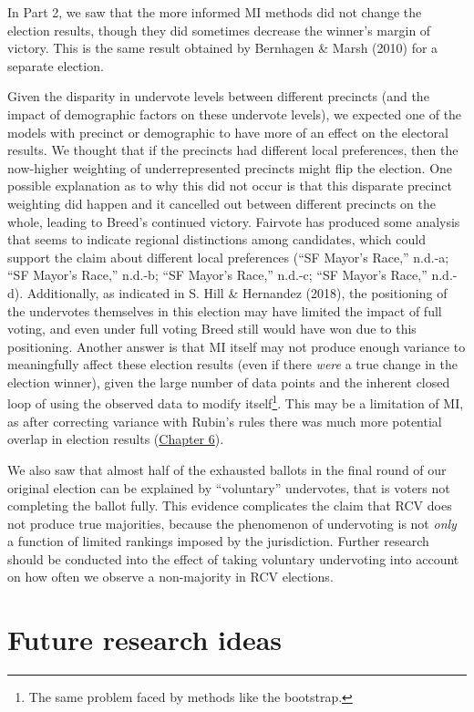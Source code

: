 \documentclass[12pt,twoside]{reedthesis}
\begin{document}
In Part 2, we saw that the more informed MI methods did not change the election results, though they did sometimes decrease the winner's margin of victory. This is the same result obtained by Bernhagen \& Marsh (2010) for a separate election.

Given the disparity in undervote levels between different precincts (and the impact of demographic factors on these undervote levels), we expected one of the models with precinct or demographic to have more of an effect on the electoral results. We thought that if the precincts had different local preferences, then the now-higher weighting of underrepresented precincts might flip the election. One possible explanation as to why this did not occur is that this disparate precinct weighting did happen and it cancelled out between different precincts on the whole, leading to Breed's continued victory. Fairvote has produced some analysis that seems to indicate regional distinctions among candidates, which could support the claim about different local preferences (``SF Mayor's Race,'' n.d.-a; ``SF Mayor's Race,'' n.d.-b; ``SF Mayor's Race,'' n.d.-c; ``SF Mayor's Race,'' n.d.-d). Additionally, as indicated in S. Hill \& Hernandez (2018), the positioning of the undervotes themselves in this election may have limited the impact of full voting, and even under full voting Breed still would have won due to this positioning. Another answer is that MI itself may not produce enough variance to meaningfully affect these election results (even if there \emph{were} a true change in the election winner), given the large number of data points and the inherent closed loop of using the observed data to modify itself\footnote{The same problem faced by methods like the bootstrap.}. This may be a limitation of MI, as after correcting variance with Rubin's rules there was much more potential overlap in election results (\protect\hyperlink{missing-results}{Chapter 6}).

We also saw that almost half of the exhausted ballots in the final round of our original election can be explained by ``voluntary'' undervotes, that is voters not completing the ballot fully. This evidence complicates the claim that RCV does not produce true majorities, because the phenomenon of undervoting is not \emph{only} a function of limited rankings imposed by the jurisdiction. Further research should be conducted into the effect of taking voluntary undervoting into account on how often we observe a non-majority in RCV elections.

\hypertarget{further-research}{%
\section{Future research ideas}\label{further-research}}
\end{document}
